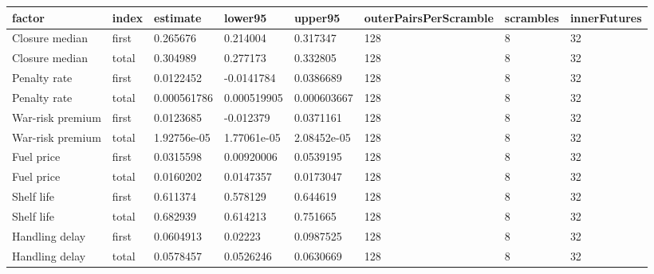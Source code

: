 \begin{tabular}{llllllll}
\toprule
factor & index & estimate & lower95 & upper95 & outerPairsPerScramble & scrambles & innerFutures \\
\midrule
Closure median & first & 0.265676 & 0.214004 & 0.317347 & 128 & 8 & 32 \\
Closure median & total & 0.304989 & 0.277173 & 0.332805 & 128 & 8 & 32 \\
Penalty rate & first & 0.0122452 & -0.0141784 & 0.0386689 & 128 & 8 & 32 \\
Penalty rate & total & 0.000561786 & 0.000519905 & 0.000603667 & 128 & 8 & 32 \\
War-risk premium & first & 0.0123685 & -0.012379 & 0.0371161 & 128 & 8 & 32 \\
War-risk premium & total & 1.92756e-05 & 1.77061e-05 & 2.08452e-05 & 128 & 8 & 32 \\
Fuel price & first & 0.0315598 & 0.00920006 & 0.0539195 & 128 & 8 & 32 \\
Fuel price & total & 0.0160202 & 0.0147357 & 0.0173047 & 128 & 8 & 32 \\
Shelf life & first & 0.611374 & 0.578129 & 0.644619 & 128 & 8 & 32 \\
Shelf life & total & 0.682939 & 0.614213 & 0.751665 & 128 & 8 & 32 \\
Handling delay & first & 0.0604913 & 0.02223 & 0.0987525 & 128 & 8 & 32 \\
Handling delay & total & 0.0578457 & 0.0526246 & 0.0630669 & 128 & 8 & 32 \\
\bottomrule
\end{tabular}
